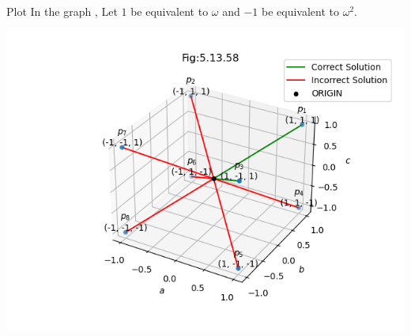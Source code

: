 \documentclass{beamer}
\begin{document}
\begin{frame}{Plot}
    \centering
In the graph , Let $1$ be equivalent to $\omega$ and $-1$ be equivalent to $\omega^2$. 
    
    \includegraphics[width=\columnwidth, height=0.8\textheight, keepaspectratio]{../figs/vector1.png}   
\end{frame}
\end{document}
